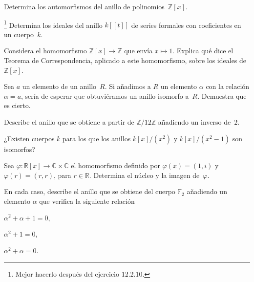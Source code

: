 \documentclass[12pt]{article}
\begin{document}
    
    \begin{exercise}[11.3.7]
        Determina los automorfismos del anillo de polinomios~$\mathbb{Z}[x]$.
    \end{exercise}
	
    
    \begin{exercise}[11.3.10]\hspace{-4mm}\footnote{Mejor hacerlo después del ejercicio 12.2.10.}
        Determina los ideales del anillo $k[\![t]\!]$ de series formales con coeficientes en un cuerpo~$k$.
    \end{exercise}
    
    
    \begin{exercise}[11.4.1]
        Considera el homomorfismo $\mathbb{Z}[x]\to \mathbb{Z}$ que envía $x\mapsto1$. Explica qué dice el Teorema de Correspondencia, aplicado a este homomorfismo, sobre los ideales de~$\mathbb{Z}[x]$.
    \end{exercise}
    
    
    
    \begin{exercise}[11.5.2]
        Sea $a$ un elemento de un anillo~$R$. Si añadimos a $R$ un elemento $\alpha$ con la relación $\alpha=a$, sería de esperar que obtuviéramos un anillo isomorfo a~$R$. Demuestra que es cierto.
    \end{exercise}
    
    \begin{exercise}[11.5.3]
        Describe el anillo  que se obtiene a partir de $\mathbb{Z}/12\mathbb{Z}$ añadiendo un inverso de~$2$.
    \end{exercise}
    
    \begin{exercise}[11.5.5]
        ¿Existen cuerpos $k$ para los que los anillos $k[x]/(x^{2})$ y $k[x]/(x^{2}-1)$ son isomorfos?
    \end{exercise}
    
    \begin{exercise}[11.6.1]
        Sea $\varphi\colon \mathbb{R}[x]\to \mathbb{C}\times \mathbb{C}$ el homomorfismo definido por $\varphi(x)=(1,i)$ y $\varphi(r)=(r,r)$, para $r\in \mathbb{R}$. Determina el núcleo y la imagen de~$\varphi$.
    \end{exercise}
    
    
    
    \begin{exercise}[11.6.4]
        En cada caso, describe el anillo que se obtiene del cuerpo $\mathbb{F}_{2}$ añadiendo un elemento $\alpha$ que verifica la siguiente relación
        
        \noindent
       \begin{inparaenum}[\bfseries(a)]
           \item $\alpha^{2}+\alpha+1=0$,
           \item $\alpha^{2}+1=0$,
           \item $\alpha^{2}+\alpha=0$.
       \end{inparaenum} 
    \end{exercise}
    
\end{document}
